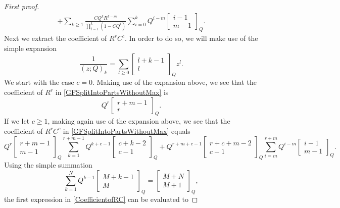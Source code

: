 \documentclass[12pt,reqno]{amsart}
\numberwithin{equation}{section}
\theoremstyle{definition}
\begin{document}
\begin{proof}[First proof]
\begin{multline}
 + \sum_{k \ge 1}  \frac{C Q^{k}R^{k-m}}{\prod_{i=1}^{k}(1-C Q^{i})}\sum_{i =0}^k Q^{i-m}
 \begin{bmatrix} i-1 \\ m-1 \end{bmatrix}_Q.
\end{multline}
Next we extract the coefficient of $R^rC^c$. In order to do so, we will make use of the simple expansion
$$\frac{1}{(z;Q)_k}=\sum_{l\geq 0}\begin{bmatrix} l+k-1 \\ l \end{bmatrix}_Q z^l.$$
We start with the case $c=0$. Making use of the expansion above, we see that the coefficient of $R^r$ in \eqref{GFSplitIntoPartsWithoutMax} is
\begin{equation}\label{CoefficientR}
    Q^r \begin{bmatrix} r+m-1 \\ r\end{bmatrix}_Q.
\end{equation}
If we let $c\geq 1$, making again use of the expansion above, we see that the coefficient of $R^rC^c$ in \eqref{GFSplitIntoPartsWithoutMax} equals
\begin{equation}\label{CoefficientofRC}
Q^r\begin{bmatrix} r+m-1 \\ m-1 \end{bmatrix}_Q\sum_{k=1}^{r+m-1}Q^{k+c-1}\begin{bmatrix} c+k-2 \\ c-1 \end{bmatrix}_Q
    +Q^{r+m+c-1}\begin{bmatrix} r+c+m-2 \\ c-1 \end{bmatrix}_Q \sum_{i=m}^{r+m}Q^{i-m}\begin{bmatrix} i-1 \\ m-1 \end{bmatrix}_Q.
\end{equation}
Using the simple summation
\begin{equation}\label{eq:simplesum}
\sum_{k=1}^NQ^{k-1}\begin{bmatrix} M+k-1 \\ M \end{bmatrix}_Q=\begin{bmatrix} M+N \\ M+1 \end{bmatrix}_Q,
\end{equation}
the first expression in \eqref{CoefficientofRC} can be evaluated to

\end{proof}
\end{document}
